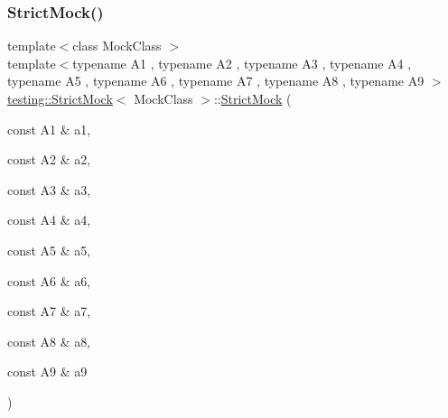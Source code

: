 \subsubsection{\texorpdfstring{Strict\+Mock()}{StrictMock()}\hspace{0.1cm}{\footnotesize\ttfamily [10/11]}}
{\footnotesize\ttfamily template$<$class Mock\+Class $>$ \\
template$<$typename A1 , typename A2 , typename A3 , typename A4 , typename A5 , typename A6 , typename A7 , typename A8 , typename A9 $>$ \\
\hyperlink{classtesting_1_1_strict_mock}{testing\+::\+Strict\+Mock}$<$ Mock\+Class $>$\+::\hyperlink{classtesting_1_1_strict_mock}{Strict\+Mock} (\begin{DoxyParamCaption}\item[{const A1 \&}]{a1,  }\item[{const A2 \&}]{a2,  }\item[{const A3 \&}]{a3,  }\item[{const A4 \&}]{a4,  }\item[{const A5 \&}]{a5,  }\item[{const A6 \&}]{a6,  }\item[{const A7 \&}]{a7,  }\item[{const A8 \&}]{a8,  }\item[{const A9 \&}]{a9 }\end{DoxyParamCaption})\hspace{0.3cm}{\ttfamily [inline]}}

\mbox{\label{classtesting_1_1_strict_mock_a4936b0a5622b39e974deae12ecb1430b}} 
